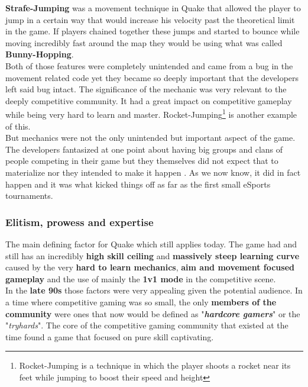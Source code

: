 \textbf{Strafe-Jumping} was a movement technique in Quake that allowed the player to jump in a certain way that would increase his velocity past the theoretical limit in the game. If players chained together these jumps and started to bounce while moving incredibly fast around the map they would be using what was called \textbf{Bunny-Hopping}.\\

Both of those features were completely unintended and came from a bug in the movement related code yet they became so deeply important that the developers left said bug intact. The significance of the mechanic was very relevant to the deeply competitive community. It had a great impact on competitive gameplay while being very hard to learn and master. Rocket-Jumping\footnote{Rocket-Jumping is a technique in which the player shoots a rocket near its feet while jumping to boost their speed and height} is another example of this.\\

But mechanics were not the only unintended but important aspect of the game. The developers fantasized at one point about having big groups and clans of people competing in their game but they themselves did not expect that to materialize nor they intended to make it happen \citep{clanHistory}. As we now know, it did in fact happen and it was what kicked things off as far as the first small eSports tournaments.

\subsubsection{Elitism, prowess and expertise}

The main defining factor for Quake which still applies today. The game had and still has an incredibly \textbf{high skill ceiling} and \textbf{massively steep learning curve} caused by the very \textbf{hard to learn mechanics}, \textbf{aim and movement focused gameplay} and the use of mainly the \textbf{1v1 mode} in the competitive scene.\\

In the \textbf{late 90s} those factors were very appealing given the potential audience. In a time where competitive gaming was so small, the only \textbf{members of the community} were ones that now would be defined as "\textit{\textbf{hardcore gamers}}" or the "\textit{tryhards}". The core of the competitive gaming community that existed at the time found a game that focused on pure skill captivating.\\

